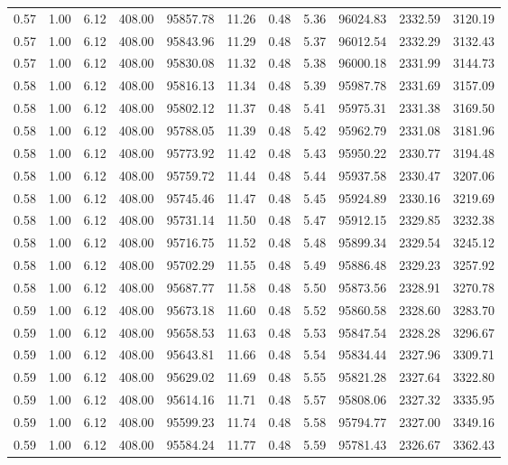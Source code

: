 \begin{table}[!ht]
\begin{tabular}{rrrrrrrrrrr}
0.57 & 1.00 & 6.12 & 408.00 & 95857.78 & 11.26 & 0.48 & 5.36 & 96024.83 & 2332.59 & 3120.19 \\
0.57 & 1.00 & 6.12 & 408.00 & 95843.96 & 11.29 & 0.48 & 5.37 & 96012.54 & 2332.29 & 3132.43 \\
0.57 & 1.00 & 6.12 & 408.00 & 95830.08 & 11.32 & 0.48 & 5.38 & 96000.18 & 2331.99 & 3144.73 \\
0.58 & 1.00 & 6.12 & 408.00 & 95816.13 & 11.34 & 0.48 & 5.39 & 95987.78 & 2331.69 & 3157.09 \\
0.58 & 1.00 & 6.12 & 408.00 & 95802.12 & 11.37 & 0.48 & 5.41 & 95975.31 & 2331.38 & 3169.50 \\
0.58 & 1.00 & 6.12 & 408.00 & 95788.05 & 11.39 & 0.48 & 5.42 & 95962.79 & 2331.08 & 3181.96 \\
0.58 & 1.00 & 6.12 & 408.00 & 95773.92 & 11.42 & 0.48 & 5.43 & 95950.22 & 2330.77 & 3194.48 \\
0.58 & 1.00 & 6.12 & 408.00 & 95759.72 & 11.44 & 0.48 & 5.44 & 95937.58 & 2330.47 & 3207.06 \\
0.58 & 1.00 & 6.12 & 408.00 & 95745.46 & 11.47 & 0.48 & 5.45 & 95924.89 & 2330.16 & 3219.69 \\
0.58 & 1.00 & 6.12 & 408.00 & 95731.14 & 11.50 & 0.48 & 5.47 & 95912.15 & 2329.85 & 3232.38 \\
0.58 & 1.00 & 6.12 & 408.00 & 95716.75 & 11.52 & 0.48 & 5.48 & 95899.34 & 2329.54 & 3245.12 \\
0.58 & 1.00 & 6.12 & 408.00 & 95702.29 & 11.55 & 0.48 & 5.49 & 95886.48 & 2329.23 & 3257.92 \\
0.58 & 1.00 & 6.12 & 408.00 & 95687.77 & 11.58 & 0.48 & 5.50 & 95873.56 & 2328.91 & 3270.78 \\
0.59 & 1.00 & 6.12 & 408.00 & 95673.18 & 11.60 & 0.48 & 5.52 & 95860.58 & 2328.60 & 3283.70 \\
0.59 & 1.00 & 6.12 & 408.00 & 95658.53 & 11.63 & 0.48 & 5.53 & 95847.54 & 2328.28 & 3296.67 \\
0.59 & 1.00 & 6.12 & 408.00 & 95643.81 & 11.66 & 0.48 & 5.54 & 95834.44 & 2327.96 & 3309.71 \\
0.59 & 1.00 & 6.12 & 408.00 & 95629.02 & 11.69 & 0.48 & 5.55 & 95821.28 & 2327.64 & 3322.80 \\
0.59 & 1.00 & 6.12 & 408.00 & 95614.16 & 11.71 & 0.48 & 5.57 & 95808.06 & 2327.32 & 3335.95 \\
0.59 & 1.00 & 6.12 & 408.00 & 95599.23 & 11.74 & 0.48 & 5.58 & 95794.77 & 2327.00 & 3349.16 \\
0.59 & 1.00 & 6.12 & 408.00 & 95584.24 & 11.77 & 0.48 & 5.59 & 95781.43 & 2326.67 & 3362.43 \\

\end{tabular}
\end{table}
